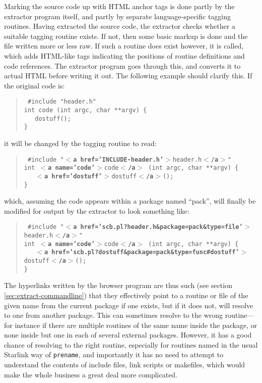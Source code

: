 \documentclass[twoside,11pt]{article}
\renewcommand{\_}{\texttt{\symbol{95}}}
\begin{document}
Marking the source code up with HTML anchor tags
is done partly by the extractor program itself,
and partly by separate language-specific tagging routines.
Having extracted the source code, the extractor
checks whether a suitable tagging routine exists.
If not, then some basic markup is done and the file written
more or less raw.
If such a routine does exist however, it is called,
which adds
HTML-like tags indicating the positions of routine definitions
and code references.
The extractor program goes through this, and converts it to
actual HTML before writing it out.
The following example should clarify this.
If the original code is:
%
%
\begin{quote}
{\tt
\#include "header.h" \\
int code (int argc, char **argv) \{ \\
\mbox{}~~~do\_stuff(); \\
\}
}
\end{quote}
it will be changed by the tagging routine to read:
\begin{quote}
{\tt
\#include "{\bf $<$a href='INCLUDE-header.h'$>$}header.h{\bf $<$/a$>$}" \\
int {\bf $<$a name='code'$>$}code{\bf $<$/a$>$} (int argc, char **argv) \{ \\
\mbox{}~~~{\bf $<$a href='do\_stuff'$>$}do\_stuff{\bf $<$/a$>$}(); \\
\}
}
\end{quote}
which, assuming the code appears within a package named ``pack'',
will finally be modified for output by the extractor to look something like:
\begin{quote}
{\tt
\#include "{\bf $<$a href='scb.pl?header.h\&package=pack\&type=file'$>$}header.h{\bf $<$/a$>$}" \\
int {\bf $<$a name='code'$>$}code{\bf $<$/a$>$} (int argc, char **argv) \{ \\
\mbox{}~~~{\bf $<$a~href='scb.pl?do\_stuff\&package=pack\&type=func\#do\_stuff'$>$}do\_stuff{\bf $<$/a$>$}(); \\
\}
}
\end{quote}
The hyperlinks written by the browser program are thus such
(see section \ref{sec:extract-commandline})
that they effectively point to a routine or file of the given name from
the current package if one exists, but if it does not, will resolve to
one from another package.
This can sometimes resolve to the wrong routine---for instance
if there are multiple routines of the same name inside the
package, or none inside but one in each of several external packages.
However, it has a good chance of resolving to the right routine,
especially for routines named in the usual Starlink way of
{\tt pre\_name}, and importantly it has no need to attempt to
understand the contents of include files, link scripts or makefiles, which
would make the whole business a great deal more complicated.
\end{document}
